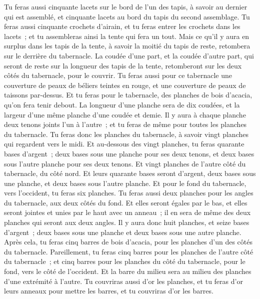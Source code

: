 \begin{multicols}{2}
Tu feras aussi cinquante lacets sur le bord de l'un des tapis, à savoir au dernier qui est assemblé, et cinquante lacets au bord du tapis du second assemblage.
Tu feras aussi cinquante crochets d'airain, et tu feras entrer les crochets dans les lacets~; et tu assembleras ainsi la tente qui fera un tout.
Mais ce qu'il y aura en surplus dans les tapis de la tente, à savoir la moitié du tapis de reste, retombera sur le derrière du tabernacle.
La coudée d'une part, et la coudée d'autre part, qui seront de reste sur la longueur des tapis de la tente, retomberont sur les deux côtés du tabernacle, pour le couvrir.
Tu feras aussi pour ce tabernacle une couverture de peaux de béliers teintes en rouge, et une couverture de peaux de taissons par-dessus.
Et tu feras pour le tabernacle, des planches de bois d'acacia, qu'on fera tenir debout.
La longueur d'une planche sera de dix coudées, et la largeur d'une même planche d'une coudée et demie.
Il y aura à chaque planche deux tenons joints l'un à l'autre~; et tu feras de même pour toutes les planches du tabernacle.
Tu feras donc les planches du tabernacle, à savoir vingt planches qui regardent vers le midi.
Et au-dessous des vingt planches, tu feras quarante bases d'argent~; deux bases sous une planche pour ses deux tenons, et deux bases sous l'autre planche pour ses deux tenons.
Et vingt planches de l'autre côté du tabernacle, du côté nord.
Et leurs quarante bases seront d'argent, deux bases sous une planche, et deux bases sous l'autre planche.
Et pour le fond du tabernacle, vers l'occident, tu feras six planches.
Tu feras aussi deux planches pour les angles du tabernacle, aux deux côtés du fond.
Et elles seront égales par le bas, et elles seront jointes et unies par le haut avec un anneau~; il en sera de même des deux planches qui seront aux deux angles.
Il y aura donc huit planches, et seize bases d'argent~; deux bases sous une planche et deux bases sous une autre planche.
Après cela, tu feras cinq barres de bois d'acacia, pour les planches d'un des côtés du tabernacle.
Pareillement, tu feras cinq barres pour les planches de l'autre côté du tabernacle~; et cinq barres pour les planches du côté du tabernacle, pour le fond, vers le côté de l'occident.
Et la barre du milieu sera au milieu des planches d'une extrémité à l'autre.
Tu couvriras aussi d'or les planches, et tu feras d'or leurs anneaux pour mettre les barres, et tu couvriras d'or les barres.

\end{multicols}
